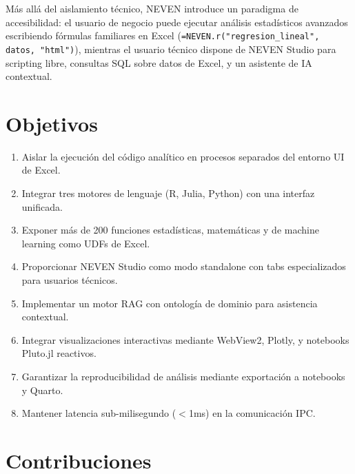 \documentclass[12pt, a4paper]{report}
\begin{document}
Más allá del aislamiento técnico, NEVEN introduce un paradigma de accesibilidad: el usuario de negocio puede ejecutar análisis estadísticos avanzados escribiendo fórmulas familiares en Excel (\texttt{=NEVEN.r("regresion\_lineal", datos, "html")}), mientras el usuario técnico dispone de NEVEN Studio para scripting libre, consultas SQL sobre datos de Excel, y un asistente de IA contextual.

\section{Objetivos}

\begin{enumerate}
    \item Aislar la ejecución del código analítico en procesos separados del entorno UI de Excel.
    \item Integrar tres motores de lenguaje (R, Julia, Python) con una interfaz unificada.
    \item Exponer más de 200 funciones estadísticas, matemáticas y de machine learning como UDFs de Excel.
    \item Proporcionar NEVEN Studio como modo standalone con tabs especializados para usuarios técnicos.
    \item Implementar un motor RAG con ontología de dominio para asistencia contextual.
    \item Integrar visualizaciones interactivas mediante WebView2, Plotly, y notebooks Pluto.jl reactivos.
    \item Garantizar la reproducibilidad de análisis mediante exportación a notebooks y Quarto.
    \item Mantener latencia sub-milisegundo ($<$1ms) en la comunicación IPC.
\end{enumerate}

\section{Contribuciones}
\end{document}
